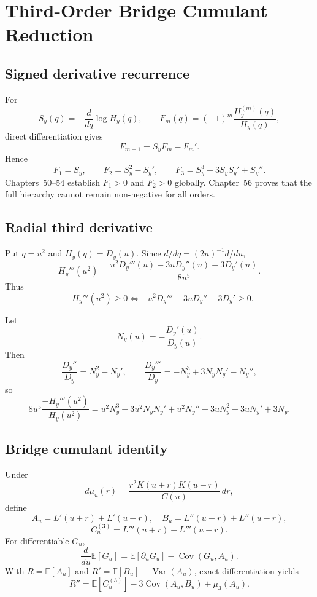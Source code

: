 \chapter{Third-Order Bridge Cumulant Reduction}
\label{chap:g024-third-order-cumulant}


\section{Signed derivative recurrence}
For
\[
S_y(q)=-\frac{d}{dq}\log H_y(q),
\qquad
F_m(q)=(-1)^m\frac{H_y^{(m)}(q)}{H_y(q)},
\]
direct differentiation gives
\[
\boxed{F_{m+1}=S_yF_m-F_m'.}
\]
Hence
\[
F_1=S_y,
\qquad F_2=S_y^2-S_y',
\qquad
\boxed{F_3=S_y^3-3S_yS_y'+S_y''.}
\]
Chapters~50--54 establish $F_1>0$ and $F_2>0$ globally. Chapter~56 proves that the full hierarchy cannot remain non-negative for all orders.

\section{Radial third derivative}
Put $q=u^2$ and $H_y(q)=D_y(u)$. Since $d/dq=(2u)^{-1}d/du$,
\[
H_y'''(u^2)
=\frac{u^2D_y'''(u)-3uD_y''(u)+3D_y'(u)}{8u^5}.
\]
Thus
\[
\boxed{-H_y'''(u^2)\ge0
\iff -u^2D_y'''+3uD_y''-3D_y'\ge0.}
\]

Let
\[
N_y(u)=-\frac{D_y'(u)}{D_y(u)}.
\]
Then
\[
\frac{D_y''}{D_y}=N_y^2-N_y',
\qquad
\frac{D_y'''}{D_y}=-N_y^3+3N_yN_y'-N_y'',
\]
so
\[
\boxed{
8u^5\frac{-H_y'''(u^2)}{H_y(u^2)}
=u^2N_y^3-3u^2N_yN_y'+u^2N_y''
+3uN_y^2-3uN_y'+3N_y.}
\]

\section{Bridge cumulant identity}
Under
\[
d\mu_u(r)=\frac{r^2K(u+r)K(u-r)}{C(u)}\,dr,
\]
define
\[
A_u=L'(u+r)+L'(u-r),\quad
B_u=L''(u+r)+L''(u-r),
\]
\[
C_u^{(3)}=L'''(u+r)+L'''(u-r).
\]
For differentiable $G_u$,
\[
\frac{d}{du}\mathbb E[G_u]
=\mathbb E[\partial_uG_u]-\operatorname{Cov}(G_u,A_u).
\]
With $R=\mathbb E[A_u]$ and $R'=\mathbb E[B_u]-\operatorname{Var}(A_u)$, exact differentiation yields
\[
\boxed{
R''=\mathbb E[C_u^{(3)}]
-3\operatorname{Cov}(A_u,B_u)
+\mu_3(A_u).}
\]

